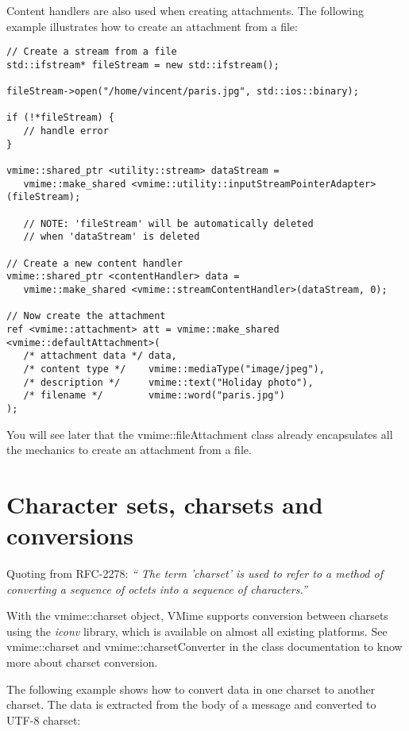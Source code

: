 Content handlers are also used when creating attachments. The following
example illustrates how to create an attachment from a file:

\begin{lstlisting}[caption={Creating an attachment from a file}]
// Create a stream from a file
std::ifstream* fileStream = new std::ifstream();

fileStream->open("/home/vincent/paris.jpg", std::ios::binary);

if (!*fileStream) {
   // handle error
}

vmime::shared_ptr <utility::stream> dataStream =
   vmime::make_shared <vmime::utility::inputStreamPointerAdapter>(fileStream);

   // NOTE: 'fileStream' will be automatically deleted
   // when 'dataStream' is deleted

// Create a new content handler
vmime::shared_ptr <contentHandler> data =
   vmime::make_shared <vmime::streamContentHandler>(dataStream, 0);

// Now create the attachment
ref <vmime::attachment> att = vmime::make_shared <vmime::defaultAttachment>(
   /* attachment data */ data,
   /* content type */    vmime::mediaType("image/jpeg"),
   /* description */     vmime::text("Holiday photo"),
   /* filename */        vmime::word("paris.jpg")
);
\end{lstlisting}

You will see later that the {\vcode vmime::fileAttachment} class already
encapsulates all the mechanics to create an attachment from a file.


\section{Character sets, charsets and conversions\label{section_charsets}}

Quoting from RFC-2278: \emph{`` The term 'charset' is used to refer to a
method of converting a sequence of octets into a sequence of characters.''}

With the {\vcode vmime::charset} object, VMime supports conversion between
charsets using the {\em iconv} library, which is available on almost all
existing platforms. See {\vcode vmime::charset} and
{\vcode vmime::charsetConverter} in the class documentation to know more
about charset conversion.

The following example shows how to convert data in one charset to another
charset. The data is extracted from the body of a message and converted
to UTF-8 charset:

